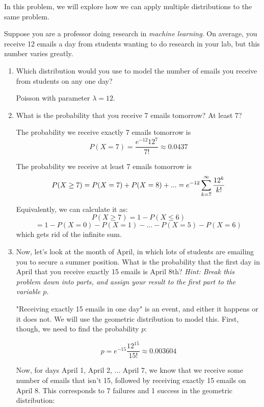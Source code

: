 \question In this problem, we will explore how we can apply multiple distributions to the same problem.

Suppose you are a professor doing research in \textit{machine learning}. On average, you receive 12 emails a day from students wanting to do research in your lab, but this number varies greatly.

\begin{enumerate}[label=(\alph*)]
\item Which distribution would you use to model the number of emails you receive from students on any one day?
\begin{solution}[2cm]
Poisson with parameter $\lambda = 12$. 
\end{solution}

\item What is the probability that you receive 7 emails tomorrow? At least 7?
\begin{solution}[2cm]
The probability we receive exactly 7 emails tomorrow is
$$P(X = 7) = \frac{e^{-12}12^7}{7!} \approx 0.0437$$

The probability we receive at least 7 emails tomorrow is
$$P(X \geq 7) = P(X = 7) + P(X = 8) + ...
\\ = e^{-12} \sum_{k = 7}^\infty \frac{12^k}{k!}$$

Equivalently, we can calculate it as:
$$P(X \geq 7) = 1 - P(X \leq 6)$$
$$= 1 - P(X = 0) - P(X = 1) - ... - P(X = 5) - P(X = 6)$$
which gets rid of the infinite sum.
\end{solution}

\item Now, let's look at the month of April, in which lots of students are emailing you to secure a summer position. What is the probability that the first day in April that you receive exactly 15 emails is April 8th? \textit{Hint: Break this problem down into parts, and assign your result to the first part to the variable $p$.}
\begin{solution}[2cm]
"Receiving exactly 15 emails in one day" is an event, and either it happens or it does not. We will use the geometric distribution to model this. First, though, we need to find the probability $p$:

$$p = e^{-15} \frac{12^{15}}{15!} \approx 0.003604$$

Now, for days April 1, April 2, ... April 7, we know that we receive some number of emails that isn't 15, followed by receiving exactly 15 emails on April 8. This corresponds to 7 failures and 1 success in the geometric distribution:


\end{solution}
\end{enumerate}
